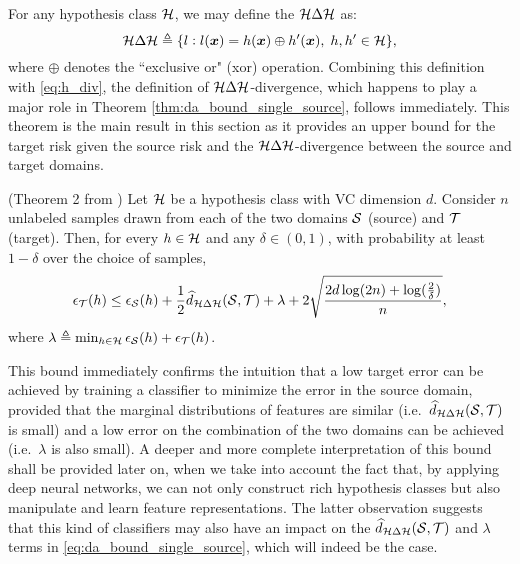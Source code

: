 For any hypothesis class ${\mathcal{H}}$, we may define the  ${\mathcal{H}} \Delta {\mathcal{H}}$ as:
\begin{equation}
    \label{eq:h_delta_h}
    {\mathcal{H}} \Delta {\mathcal{H}} \triangleq \{l: l({\bm{x}}) = h({\bm{x}}) \oplus h'({\bm{x}}), \; h, h' \in {\mathcal{H}}\},
\end{equation}
where $\oplus$ denotes the ``exclusive or" (xor) operation. Combining this definition with \eqref{eq:h_div}, the definition of ${\mathcal{H}} \Delta {\mathcal{H}}$-divergence, which happens to play a major role in Theorem \ref{thm:da_bound_single_source}, follows immediately. This theorem is the main result in this section as it provides an upper bound for the target risk given the source risk and the ${\mathcal{H}} \Delta {\mathcal{H}}$-divergence between the source and target domains.
\begin{theorem}
    \label{thm:da_bound_single_source} (Theorem 2 from \citet{BenDavid2010}) Let ${\mathcal{H}}$ be a hypothesis class with VC dimension $d$. Consider $n$ unlabeled samples drawn from each of the two domains ${\mathcal{S}}$ (source) and ${\mathcal{T}}$ (target). Then, for every $h \in {\mathcal{H}}$ and any $\delta \in (0,1)$, with probability at least $1-\delta$ over the choice of samples,
    \begin{equation}
        \label{eq:da_bound_single_source}
        \epsilon_{\mathcal{T}}(h) \leq \epsilon_{\mathcal{S}}(h) + \frac{1}{2} \widehat{d}_{{\mathcal{H}} \Delta {\mathcal{H}}}({\mathcal{S}}, {\mathcal{T}}) + \lambda + 2\sqrt{\frac{2d\log(2n) + \log(\frac{2}{\delta})}{n}},
    \end{equation}
    where $\lambda \triangleq \min_{h \in {\mathcal{H}}} \epsilon_{\mathcal{S}}(h) + \epsilon_{\mathcal{T}}(h)$.
\end{theorem}
This bound immediately confirms the intuition that a low target error can be achieved by training a classifier to minimize the error in the source domain, provided that the marginal distributions of features are similar (i.e.\ $\widehat{d}_{{\mathcal{H}} \Delta {\mathcal{H}}}({\mathcal{S}}, {\mathcal{T}})$ is small) and a low error on the combination of the two domains can be achieved (i.e.\ $\lambda$ is also small). A deeper and more complete interpretation of this bound shall be provided later on, when we take into account the fact that, by applying deep neural networks, we can not only construct rich hypothesis classes but also manipulate and learn feature representations. The latter observation suggests that this kind of classifiers may also have an impact on the $\widehat{d}_{{\mathcal{H}} \Delta {\mathcal{H}}}({\mathcal{S}}, {\mathcal{T}})$ and $\lambda$ terms in \eqref{eq:da_bound_single_source}, which will indeed be the case.

